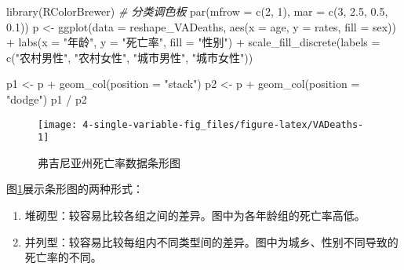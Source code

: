 \documentclass[
  lang=cn,
  11pt,
  scheme=chinese,
  chinesefont=nofont,
  citestyle=gb7714-2015,
  bibstyle=gb7714-2015]{elegantbook}
\newenvironment{Shaded}{\begin{snugshade}}{\end{snugshade}}
\newcommand{\AttributeTok}[1]{\textcolor[rgb]{0.77,0.63,0.00}{#1}}
\newcommand{\CommentTok}[1]{\textcolor[rgb]{0.56,0.35,0.01}{\textit{#1}}}
\newcommand{\DecValTok}[1]{\textcolor[rgb]{0.00,0.00,0.81}{#1}}
\newcommand{\FloatTok}[1]{\textcolor[rgb]{0.00,0.00,0.81}{#1}}
\newcommand{\FunctionTok}[1]{\textcolor[rgb]{0.00,0.00,0.00}{#1}}
\newcommand{\NormalTok}[1]{#1}
\newcommand{\OtherTok}[1]{\textcolor[rgb]{0.56,0.35,0.01}{#1}}
\newcommand{\SpecialCharTok}[1]{\textcolor[rgb]{0.00,0.00,0.00}{#1}}
\newcommand{\StringTok}[1]{\textcolor[rgb]{0.31,0.60,0.02}{#1}}
\begin{document}
\begin{Shaded}
\begin{Highlighting}[]
\FunctionTok{library}\NormalTok{(RColorBrewer)  }\CommentTok{\# 分类调色板}
\FunctionTok{par}\NormalTok{(}\AttributeTok{mfrow =} \FunctionTok{c}\NormalTok{(}\DecValTok{2}\NormalTok{, }\DecValTok{1}\NormalTok{), }\AttributeTok{mar =} \FunctionTok{c}\NormalTok{(}\DecValTok{3}\NormalTok{, }\FloatTok{2.5}\NormalTok{, }\FloatTok{0.5}\NormalTok{, }\FloatTok{0.1}\NormalTok{))}
\NormalTok{p }\OtherTok{\textless{}{-}} \FunctionTok{ggplot}\NormalTok{(}\AttributeTok{data =}\NormalTok{ reshape\_VADeaths, }
            \FunctionTok{aes}\NormalTok{(}\AttributeTok{x =}\NormalTok{ age, }\AttributeTok{y =}\NormalTok{ rates, }\AttributeTok{fill =}\NormalTok{ sex)) }\SpecialCharTok{+}
  \FunctionTok{labs}\NormalTok{(}\AttributeTok{x =} \StringTok{"年龄"}\NormalTok{, }\AttributeTok{y =} \StringTok{"死亡率"}\NormalTok{, }\AttributeTok{fill =} \StringTok{"性别"}\NormalTok{) }\SpecialCharTok{+}
  \FunctionTok{scale\_fill\_discrete}\NormalTok{(}\AttributeTok{labels =} \FunctionTok{c}\NormalTok{(}\StringTok{"农村男性"}\NormalTok{, }\StringTok{"农村女性"}\NormalTok{,}
                                 \StringTok{"城市男性"}\NormalTok{, }\StringTok{"城市女性"}\NormalTok{))}

\NormalTok{p1 }\OtherTok{\textless{}{-}}\NormalTok{ p }\SpecialCharTok{+} 
  \FunctionTok{geom\_col}\NormalTok{(}\AttributeTok{position =} \StringTok{"stack"}\NormalTok{)}
\NormalTok{p2 }\OtherTok{\textless{}{-}}\NormalTok{ p }\SpecialCharTok{+}
  \FunctionTok{geom\_col}\NormalTok{(}\AttributeTok{position =} \StringTok{"dodge"}\NormalTok{)}
\NormalTok{p1 }\SpecialCharTok{/}\NormalTok{ p2}
\end{Highlighting}
\end{Shaded}

\begin{figure}

{\centering \texttt{[image: 4-single-variable-fig\_files/figure-latex/VADeaths-1]} 

}

\caption{弗吉尼亚州死亡率数据条形图}\label{fig:VADeaths}
\end{figure}

图\ref{fig:VADeaths}展示条形图的两种形式：

\begin{enumerate}
\def\labelenumi{\arabic{enumi}.}
\item
  堆砌型：较容易比较各组之间的差异。图中为各年龄组的死亡率高低。
\item
  并列型：较容易比较每组内不同类型间的差异。图中为城乡、性别不同导致的死亡率的不同。
\end{enumerate}
\end{document}
